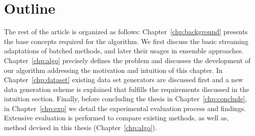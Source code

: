 \section{Outline}
The rest of the article is organized as follows: Chapter~\ref{chp:background} presents the base concepts required for the algorithm. We first discuss the basic streaming adaptations of batched methods, and later their usages in ensemble approaches. Chapter~\ref{chp:algo} precisely defines the problem and discusses the development of our algorithm addressing the motivation and intuition of this chapter. In Chapter~\ref{chp:dataset} existing data set generators are discussed first and a new data generation scheme is explained that fulfills the requirements discussed in the intuition section. Finally, before concluding the thesis in Chapter~\ref{chp:conclude}, in Chapter~\ref{chp:exp} we detail the experimental evaluation process and findings. Extensive evaluation is performed to compare existing methods, as well as, method devised in this thesis  (Chapter~\ref{chp:algo}). 
